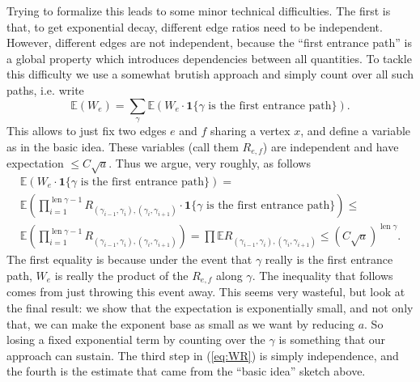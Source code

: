 \documentclass{emsprocart}
\theoremstyle{plain}
\begin{document}
Trying to formalize this leads to some minor technical difficulties.
The first is that, to get exponential decay, different edge ratios
need to be independent. However, different edges are not independent,
because the ``first entrance path'' is a global property which introduces
dependencies between all quantities. To tackle this difficulty we
use a somewhat brutish approach and simply count over all such paths,
i.e. write
\[
\mathbb{E}\left(W_{e}\right)=\sum_{\gamma}\mathbb{E}\left(W_{e}\cdot\mathbf{1}\{\gamma\mbox{ is the first entrance path}\}\right).
\]
This allows to just fix two edges $e$ and $f$ sharing a vertex $x$,
and define a variable as in the basic idea. These variables (call
them $R_{e,f}$) are independent and have expectation $\le C\sqrt{a}$.
Thus we argue, very roughly, as follows 
\begin{multline}
\mathbb{E}\left(W_{e}\cdot\mathbf{1}\{\gamma\mbox{ is the first entrance path}\}\right)=\\
\mathbb{E}\left(\prod_{i=1}^{\operatorname{len}\gamma-1}R_{(\gamma_{i-1},\gamma_{i}),(\gamma_{i},\gamma_{i+1})}\cdot\mathbf{1}\{\gamma\mbox{ is the first entrance path}\}\right)\le\\
\mathbb{E}\left(\prod_{i=1}^{\operatorname{len}\gamma-1}R_{(\gamma_{i-1},\gamma_{i}),(\gamma_{i},\gamma_{i+1})}\right)=\prod\mathbb{E}R_{(\gamma_{i-1},\gamma_{i}),(\gamma_{i},\gamma_{i+1})}\le\left(C\sqrt{a}\right)^{\operatorname{len}\gamma}.\label{eq:WR}
\end{multline}
The first equality is because under the event that $\gamma$ really
is the first entrance path, $W_{e}$ is really the product of the
$R_{e,f}$ along $\gamma$. The inequality that follows comes from
just throwing this event away. This seems very wasteful, but look
at the final result: we show that the expectation is exponentially
small, and not only that, we can make the exponent base as small as
we want by reducing $a$. So losing a fixed exponential term by counting
over the $\gamma$ is something that our approach can sustain. The
third step in (\ref{eq:WR}) is simply independence, and the fourth
is the estimate that came from the ``basic idea'' sketch above.
\end{document}
